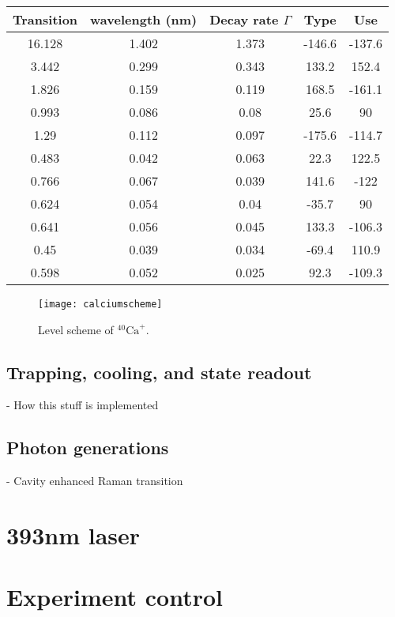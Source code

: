 \begin{tabular}{c c c c c}
 \toprule
    {Transition} & {wavelength (nm)} & {Decay rate $\Gamma$} & {Type} & {Use} \\ \midrule
   16.128 & 1.402 & 1.373 & -146.6 & -137.6 \\
     3.442  & 0.299 & 0.343 & 133.2  & 152.4  \\
     1.826  & 0.159 & 0.119 & 168.5  & -161.1 \\
     0.993  & 0.086 & 0.08  & 25.6   & 90     \\ \midrule
   1.29   & 0.112 & 0.097 & -175.6 & -114.7 \\
     0.483  & 0.042 & 0.063 & 22.3   & 122.5  \\
     0.766  & 0.067 & 0.039 & 141.6  & -122   \\
     0.624  & 0.054 & 0.04  & -35.7  & 90     \\ \midrule
   0.641  & 0.056 & 0.045 & 133.3  & -106.3 \\
     0.45   & 0.039 & 0.034 & -69.4  & 110.9  \\
     0.598  & 0.052 & 0.025 & 92.3   & -109.3 \\ \bottomrule
\end{tabular}

\begin{figure}
\centering
\texttt{[image: calciumscheme]}
\caption{Level scheme of $^{40}\text{Ca}^+$.}
\label{calciumscheme}
\end{figure}


\subsection{Trapping, cooling, and state readout}
- How this stuff is implemented
\subsection{Photon generations}
- Cavity enhanced Raman transition
\section{393nm laser}
\section{Experiment control}
